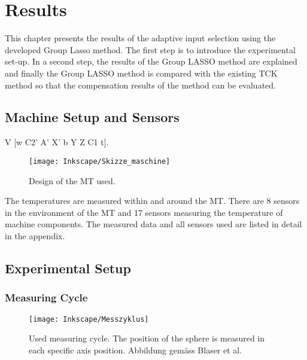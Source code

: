 \chapter{Results}
\label{chp:results}

This chapter presents the results of the adaptive input selection using the developed Group Lasso method. The first step is to introduce the experimental set-up. In a second step, the results of the Group LASSO method are explained and finally the Group LASSO method is compared with the existing TCK method so that the compensation results of the method can be evaluated.


\section{Machine Setup and Sensors}
\label{sec:machine_setup}



V [w C2' A' X' b Y Z C1 t].

\begin{figure}[!htb]
    \centering
    \texttt{[image: Inkscape/Skizze\_maschine]} %
    \caption[Design of the machine]{Design of the MT used.}
    \label{fig:Design}
\end{figure}

The temperatures are measured within and around the MT. There are 8 sensors in the environment of the MT and 17 sensors measuring the temperature of machine components. The measured data and all sensors used are listed in detail in the appendix.

\section{Experimental Setup}
\label{sec:experimentalsetup}

\subsection{Measuring Cycle}
\label{sec:measuring_cycle}

\begin{figure}[!htb]
    \centering
    \texttt{[image: Inkscape/Messzyklus]} %
    \caption[Measuring cycle]{Used measuring cycle. The position of the sphere is measured in each specific axis position. Abbildung gemäss Blaser et al. \cite{Blaser_2017}}
    \label{fig:messzyklus.}
\end{figure}

